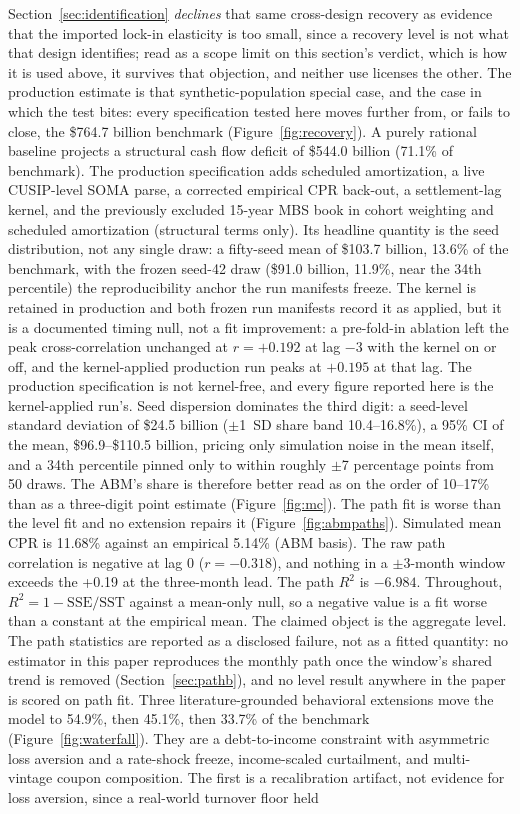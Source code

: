 \documentclass[12pt]{article}
\begin{document}
Section~\ref{sec:identification} \emph{declines} that same cross-design recovery as evidence that the imported lock-in elasticity is too small, since a recovery level is not what that design identifies; read as a scope limit on this section's verdict, which is how it is used above, it survives that objection, and neither use licenses the other. The production estimate is that synthetic-population special case, and the case in which the test bites: every specification tested here moves further from, or fails to close, the \$764.7 billion benchmark (Figure~\ref{fig:recovery}). A purely rational baseline projects a structural cash flow deficit of \$544.0 billion (71.1\% of benchmark). The production specification adds scheduled amortization, a live CUSIP-level SOMA parse, a corrected empirical CPR back-out, a settlement-lag kernel, and the previously excluded 15-year MBS book in cohort weighting and scheduled amortization (structural terms only). Its headline quantity is the seed distribution, not any single draw: a fifty-seed mean of \$103.7 billion, 13.6\% of the benchmark, with the frozen seed-42 draw (\$91.0 billion, 11.9\%, near the 34th percentile) the reproducibility anchor the run manifests freeze. The kernel is retained in production and both frozen run manifests record it as applied, but it is a documented timing null, not a fit improvement: a pre-fold-in ablation left the peak cross-correlation unchanged at $r = +0.192$ at lag $-3$ with the kernel on or off, and the kernel-applied production run peaks at $+0.195$ at that lag. The production specification is not kernel-free, and every figure reported here is the kernel-applied run's. Seed dispersion dominates the third digit: a seed-level standard deviation of \$24.5 billion ($\pm$1~SD share band 10.4--16.8\%), a 95\% CI of the mean, \$96.9--\$110.5 billion, pricing only simulation noise in the mean itself, and a 34th percentile pinned only to within roughly $\pm$7 percentage points from 50 draws. The ABM's share is therefore better read as on the order of 10--17\% than as a three-digit point estimate (Figure~\ref{fig:mc}). The path fit is worse than the level fit and no extension repairs it (Figure~\ref{fig:abmpaths}). Simulated mean CPR is 11.68\% against an empirical 5.14\% (ABM basis). The raw path correlation is negative at lag 0 ($r = -0.318$), and nothing in a $\pm$3-month window exceeds the +0.19 at the three-month lead. The path $R^2$ is $-6.984$. Throughout, $R^2 = 1-\mathrm{SSE}/\mathrm{SST}$ against a mean-only null, so a negative value is a fit worse than a constant at the empirical mean. The claimed object is the aggregate level. The path statistics are reported as a disclosed failure, not as a fitted quantity: no estimator in this paper reproduces the monthly path once the window's shared trend is removed (Section~\ref{sec:pathb}), and no level result anywhere in the paper is scored on path fit. Three literature-grounded behavioral extensions move the model to 54.9\%, then 45.1\%, then 33.7\% of the benchmark (Figure~\ref{fig:waterfall}). They are a debt-to-income constraint with asymmetric loss aversion and a rate-shock freeze, income-scaled curtailment, and multi-vintage coupon composition. The first is a recalibration artifact, not evidence for loss aversion, since a real-world turnover floor held 
\end{document}
